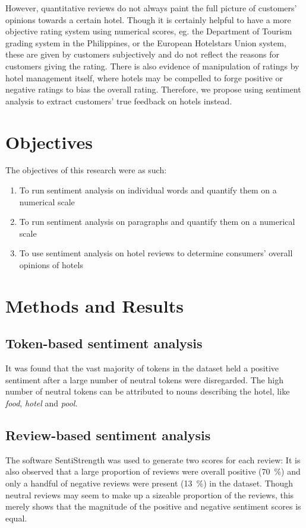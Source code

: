 \documentclass[11pt, a4paper]{pancake-article}
\begin{document}
However, quantitative reviews do not always paint the full picture of customers'
opinions towards a certain hotel. Though it is certainly helpful to have a more
objective rating system using numerical scores, eg. the Department of Tourism
grading system in the Philippines, or the European Hotelstars Union system,
these are given by customers subjectively and do not reflect the reasons for
customers giving the rating. There is also evidence of manipulation of ratings
by hotel management itself, where hotels may be compelled to forge positive or
negative ratings to bias the overall rating.
Therefore, we propose using sentiment analysis to extract customers' true
feedback on hotels instead.

\section{Objectives}
The objectives of this research were as such:
\begin{enumerate}
  \item To run sentiment analysis on individual words and quantify
    them on a numerical scale
  \item To run sentiment analysis on paragraphs and quantify them on
    a numerical scale
  \item To use sentiment analysis on hotel reviews to determine
    consumers' overall opinions of hotels
\end{enumerate}

\section{Methods and Results}

\subsection{Token-based sentiment analysis}\label{sec:tokens}
It was found that the vast majority
of tokens in the dataset held a positive sentiment  after a large
number of neutral tokens were disregarded.
The high number of neutral tokens can be attributed to nouns
describing the hotel, like \textit{food}, \textit{hotel} and \textit{pool}.

\subsection{Review-based sentiment analysis}\label{sec:reviews}

The software SentiStrength was used to generate two scores for each review:
It is also observed that a large proportion of reviews were overall
positive (\qty{70}{\percent})
and only a handful of negative reviews were present
(\qty{13}{\percent}) in the dataset.
Though neutral reviews may seem to make up a sizeable proportion of
the reviews, this merely
shows that the magnitude of the positive and negative sentiment scores is equal.
\end{document}
